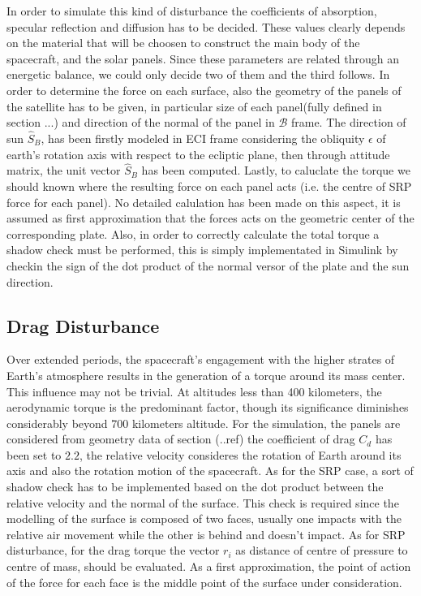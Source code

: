 In order to simulate this kind of disturbance the coefficients of absorption, specular reflection and diffusion
has to be decided. These values clearly depends on the material that will be choosen to construct the main body
of the spacecraft, and the solar panels. Since these parameters are related through an energetic balance, we could 
only decide two of them and the third follows. In order to determine the force on each surface, also the geometry of
the panels of the satellite has to be given, in particular size of each 
panel(fully defined in section ...) and direction of the normal of the panel
in $\mathcal{B}$ frame. The direction of sun $\hat{S}_B$, has been firstly modeled in ECI frame considering the obliquity
$\epsilon$ of earth's rotation axis with respect to the ecliptic plane, then through attitude matrix, the unit vector $\hat{S}_B$
has been computed. Lastly, to caluclate the torque we should known where the resulting force on each panel acts (i.e. the centre of
SRP force for each panel). No detailed calulation has been made on this aspect, it is assumed as first approximation that the 
forces acts on the geometric center of the corresponding plate. Also, in order to correctly calculate the total
torque a shadow check must be performed, this is simply implementated in Simulink by checkin the sign
of the dot product of the normal versor of the plate and the sun direction.

\subsection{Drag Disturbance}
\label{subsec:dist_drag}

Over extended periods, the spacecraft's engagement with the higher strates of Earth's atmosphere results
in the generation of a torque around its mass center. This influence may not be trivial. At altitudes 
less than 400 kilometers, the aerodynamic torque is the predominant factor, though its significance diminishes 
considerably beyond 700 kilometers altitude. For the simulation, the panels are considered from geometry data of section (..ref)
the coefficient of drag $C_d$ has been set to $2.2$, the relative velocity consideres the rotation of Earth around its axis and also 
the rotation motion of the spacecraft. As for the SRP case, a sort of shadow check has to be implemented based on the dot product between 
the relative velocity and the normal of the surface. This check is required since the modelling of the surface is composed of two faces, usually
one impacts with the relative air movement while the other is behind and doesn't impact. As for SRP disturbance, for the drag torque the 
vector $r_i$ as distance of centre of pressure to centre of mass, should be evaluated. As a first approximation, the point of action of the 
force for each face is the middle point of the surface under consideration.

